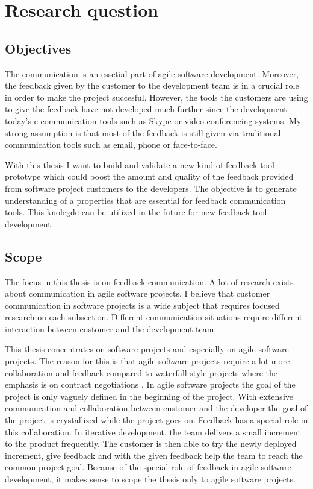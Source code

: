\documentclass[english,12pt,a4paper,pdftex]{article}
\begin{document}
\clearpage

\section{Research question}
\label{sec:research_question}

\subsection{Objectives}

The communication is an essetial part of agile software development. Moreover, the feedback given by the customer to the development team is in a crucial role in order to make the project succesful. However, the tools the customers are using to give the feedback have not developed much further since the development today's e-communication tools such as Skype or video-conferencing systems. My strong assumption is that most of the feedback is still given via traditional communication tools such as email, phone or face-to-face.

With this thesis I want to build and validate a new kind of feedback tool prototype which could boost the amount and quality of the feedback provided from software project customers to the developers. The objective is to generate understanding of a properties that are essential for feedback communication tools. This knolegde can be utilized in the future for new feedback tool development.

\subsection{Scope}

The focus in this thesis is on feedback communication. A lot of research exists about communication in agile software projects. I believe that customer communication in software projects is a wide subject that requires focused research on each subsection. Different communication situations require different interaction between customer and the development team. 

This thesis concentrates on software projects and especially on agile software projects. The reason for this is that agile software projects require a lot more collaboration and feedback compared to waterfall style projects where the emphasis is on contract negotiations \citep{larman2004}. In agile software projects the goal of the project is only vaguely defined in the beginning of the project. With extensive communication and collaboration between customer and the developer the goal of the project is crystallized while the project goes on. Feedback has a special role in this collaboration. In iterative development, the team delivers a small increment to the product frequently. The customer is then able to try the newly deployed increment, give feedback and with the given feedback help the team to reach the common project goal. Because of the special role of feedback in agile software development, it makes sense to scope the thesis only to agile software projects.
\end{document}
